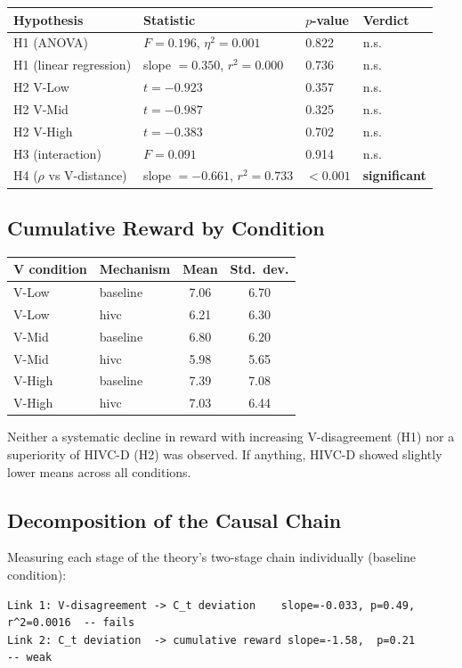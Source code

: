 \documentclass[11pt]{article}
\begin{document}
\begin{longtable}{@{}l l l l@{}}
\toprule
Hypothesis & Statistic & $p$-value & Verdict \\
\midrule
H1 (ANOVA) & $F=0.196$, $\eta^2=0.001$ & 0.822 & n.s. \\
H1 (linear regression) & slope $=0.350$, $r^2=0.000$ & 0.736 & n.s. \\
H2 V-Low & $t=-0.923$ & 0.357 & n.s. \\
H2 V-Mid & $t=-0.987$ & 0.325 & n.s. \\
H2 V-High & $t=-0.383$ & 0.702 & n.s. \\
H3 (interaction) & $F=0.091$ & 0.914 & n.s. \\
H4 ($\rho$ vs V-distance) & slope $=-0.661$, $r^2=0.733$ & $<0.001$ & \textbf{significant} \\
\bottomrule
\end{longtable}

\subsection{Cumulative Reward by Condition}

\begin{longtable}{@{}l l c c@{}}
\toprule
V condition & Mechanism & Mean & Std.\ dev. \\
\midrule
V-Low  & baseline & 7.06 & 6.70 \\
V-Low  & hivc     & 6.21 & 6.30 \\
V-Mid  & baseline & 6.80 & 6.20 \\
V-Mid  & hivc     & 5.98 & 5.65 \\
V-High & baseline & 7.39 & 7.08 \\
V-High & hivc     & 7.03 & 6.44 \\
\bottomrule
\end{longtable}

Neither a systematic decline in reward with increasing V-disagreement (H1) nor a superiority of HIVC-D (H2) was observed. If anything, HIVC-D showed slightly lower means across all conditions.

\subsection{Decomposition of the Causal Chain}

Measuring each stage of the theory's two-stage chain individually (baseline condition):

\begin{Verbatim}[frame=single,fontsize=\small]
Link 1: V-disagreement -> C_t deviation    slope=-0.033, p=0.49, r^2=0.0016  -- fails
Link 2: C_t deviation  -> cumulative reward slope=-1.58,  p=0.21              -- weak
\end{Verbatim}
\end{document}
